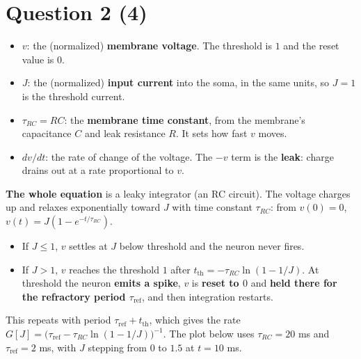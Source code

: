 \documentclass[11pt,letterpaper]{article}
\newcommand{\tref}{\tau_{\mathrm{ref}}}
\newcommand{\trc}{\tau_{RC}}
\begin{document}
\section*{Question 2 \hfill (4)}
\begin{itemize}[leftmargin=1.2em]
\item $v$: the (normalized) \textbf{membrane voltage}. The threshold is $1$ and the reset value is $0$.
\item $J$: the (normalized) \textbf{input current} into the soma, in the same units, so $J = 1$ is the threshold current.
\item $\trc = RC$: the \textbf{membrane time constant}, from the membrane's capacitance $C$ and leak resistance $R$. It sets how fast $v$ moves.
\item $dv/dt$: the rate of change of the voltage. The $-v$ term is the \textbf{leak}: charge drains out at a rate proportional to $v$.
\end{itemize}
\textbf{The whole equation} is a leaky integrator (an RC circuit). The voltage charges up and relaxes exponentially toward $J$ with time constant $\trc$: from $v(0) = 0$, $v(t) = J(1 - e^{-t/\trc})$.
\begin{itemize}[leftmargin=1.2em]
\item If $J \le 1$, $v$ settles at $J$ below threshold and the neuron never fires.
\item If $J > 1$, $v$ reaches the threshold $1$ after $t_{\mathrm{th}} = -\trc\ln(1 - 1/J)$. At threshold the neuron \textbf{emits a spike}, $v$ is \textbf{reset to $0$} and \textbf{held there for the refractory period $\tref$}, and then integration restarts.
\end{itemize}
This repeats with period $\tref + t_{\mathrm{th}}$, which gives the rate $G[J] = \bigl(\tref - \trc\ln(1 - 1/J)\bigr)^{-1}$. The plot below uses $\trc = 20$ ms and $\tref = 2$ ms, with $J$ stepping from $0$ to $1.5$ at $t = 10$ ms.
\begin{center}
\end{center}
\end{document}
